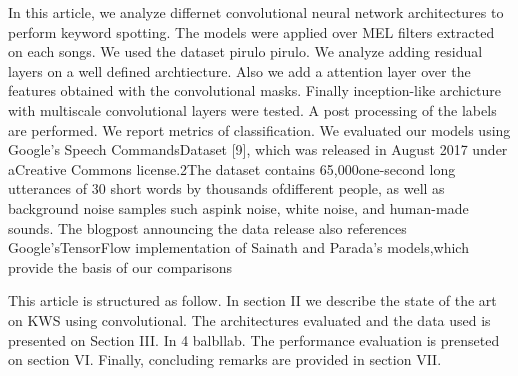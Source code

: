 In this article, we analyze differnet convolutional neural network architectures to perform keyword spotting. The models were applied over MEL filters extracted on each songs. We used the dataset pirulo pirulo. We analyze adding residual layers on a well defined archtiecture. Also we add a attention layer over the features obtained with the convolutional masks. Finally inception-like archicture with multiscale convolutional layers were tested. A post processing of the labels are performed. We report metrics of classification.
We evaluated our models using Google’s Speech CommandsDataset  [9],  which  was  released  in  August  2017  under  aCreative  Commons  license.2The  dataset  contains  65,000one-second long utterances of 30 short words by thousands ofdifferent people, as well as background noise samples such aspink noise, white noise, and human-made sounds.  The blogpost  announcing  the  data  release  also  references  Google’sTensorFlow implementation of Sainath and Parada’s models,which provide the basis of our comparisons

This article is structured as follow. In section II we describe the state of the art on KWS using convolutional. The architectures evaluated and the data used is presented on Section III. In 4 balbllab. The performance evaluation is prenseted on section VI. Finally, concluding remarks are provided in section VII.

